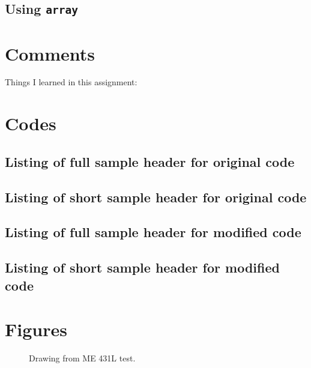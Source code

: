 \documentclass{article}
\begin{document}
\subsection{Using {\tt array}} %
\pagebreak

\section{Comments} %
Things I learned in this assignment:


\pagebreak
\appendix
\section{Codes}
\subsection{Listing of full sample header for original code}

\subsection{Listing of short sample header for original code}

\subsection{Listing of full sample header for modified code}

\subsection{Listing of short sample header for modified code}

\pagebreak
\section{Figures \label{FigureList}}

\begin{figure}[htb]
\begin{center}
\caption{Drawing from ME 431L test.}
\end{center}
\end{figure}
\end{document}
